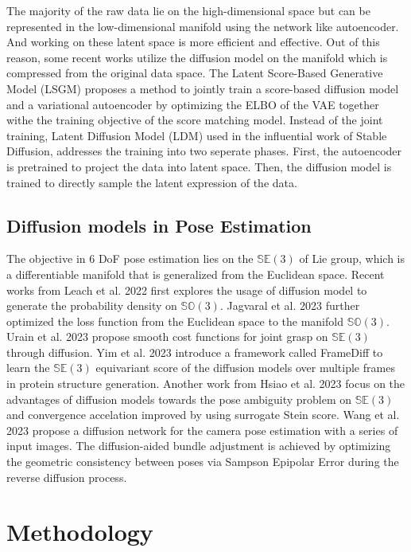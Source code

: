 \documentclass[12pt,DIV14,BCOR12mm,a4paper,footinclude=false,headinclude,parskip=half-,twoside,openright,cleardoublepage=empty,toc=index,bibliography=totoc,listof=totoc]{scrreprt}
\numberwithin{equation}{chapter}
\begin{document}
The majority of the raw data lie on the high-dimensional space but can be represented in the low-dimensional manifold using the network like autoencoder. And working on these latent space is more efficient and effective. Out of this reason, some recent works utilize the diffusion model on the manifold which is compressed from the original data space. The Latent Score-Based Generative Model (LSGM) \cite{vahdat2021scorebased} proposes a method to jointly train a score-based diffusion model and a variational autoencoder by optimizing the ELBO of the VAE together withe the training objective of the score matching model. Instead of the joint training, Latent Diffusion Model (LDM) \cite{rombach2022highresolution} used in the influential work of Stable Diffusion, addresses the training into two seperate phases. First, the autoencoder is pretrained to project the data into latent space. Then, the diffusion model is trained to directly sample the latent expression of the data.

\section{Diffusion models in Pose Estimation}
The objective in 6 DoF pose estimation lies on the $\mathbb{SE}(3)$ of Lie group, which is a differentiable manifold that is generalized from the Euclidean space. Recent works from Leach et al. 2022 \cite{leach2022denoising} first explores the usage of diffusion model to generate the probability density on $\mathbb{SO}(3)$. Jagvaral et al. 2023 \cite{jagvaral2023diffusion} further optimized the loss function from the Euclidean space to the manifold $\mathbb{SO}(3)$. Urain et al. 2023 \cite{urain2023se3diffusionfields} 
propose smooth cost functions for joint grasp on $\mathbb{SE}(3)$ through diffusion. Yim et al. 2023 \cite{yim2023se3} introduce a framework called FrameDiff to learn the $\mathbb{SE}(3)$ equivariant score of the diffusion models over multiple frames in protein structure generation. Another work from Hsiao et al. 2023 \cite{hsiao2023confronting} focus on the advantages of diffusion models towards the pose ambiguity problem on $\mathbb{SE}(3)$ and convergence accelation improved by using surrogate Stein score. Wang et al. 2023 \cite{wang2023pd} propose a diffusion network for the camera pose estimation with a series of input images. The diffusion-aided bundle adjustment is achieved by optimizing the geometric consistency between poses via Sampson Epipolar Error during the reverse diffusion process.
\chapter{Methodology}
\end{document}
